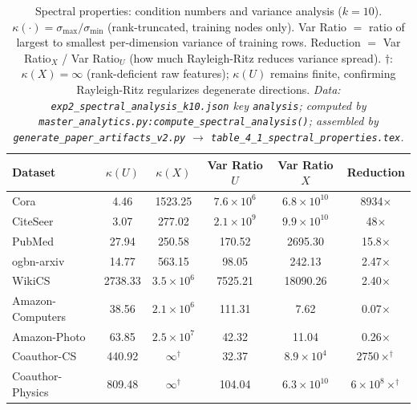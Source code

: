 \documentclass[11pt]{article}
\begin{document}
\begin{table}[H]
\centering\small
\caption{Spectral properties: condition numbers and variance analysis ($k{=}10$).
$\kappa(\cdot){=}\sigma_{\max}/\sigma_{\min}$ (rank-truncated, training nodes only).
Var Ratio $=$ ratio of largest to smallest per-dimension variance of training rows.
Reduction $=$ Var Ratio$_X$ / Var Ratio$_U$ (how much Rayleigh-Ritz reduces variance spread).
$\dagger$: $\kappa(X){=}\infty$ (rank-deficient raw features); $\kappa(U)$ remains finite,
confirming Rayleigh-Ritz regularizes degenerate directions.
\textit{\scriptsize Data: \texttt{exp2\_spectral\_analysis\_k10.json} key \texttt{analysis};
computed by \texttt{master\_analytics.py:compute\_spectral\_analysis()};
assembled by \texttt{generate\_paper\_artifacts\_v2.py} $\to$ \texttt{table\_4\_1\_spectral\_properties.tex}.}}
\label{tab:spectral_properties}
\begin{tabular}{lccccc}
\toprule
Dataset & $\kappa(U)$ & $\kappa(X)$ & Var Ratio $U$ & Var Ratio $X$ & Reduction \\
\midrule
Cora               & 4.46   & 1523.25       & $7.6\times10^6$    & $6.8\times10^{10}$ & 8934$\times$ \\
CiteSeer           & 3.07   & 277.02        & $2.1\times10^9$    & $9.9\times10^{10}$ & 48$\times$ \\
PubMed             & 27.94  & 250.58        & 170.52             & 2695.30            & 15.8$\times$ \\
ogbn-arxiv         & 14.77  & 563.15        & 98.05              & 242.13             & 2.47$\times$ \\
WikiCS             & 2738.33& $3.5\times10^6$& 7525.21          & 18090.26           & 2.40$\times$ \\
Amazon-Computers   & 38.56  & $2.1\times10^6$& 111.31           & 7.62               & 0.07$\times$ \\
Amazon-Photo       & 63.85  & $2.5\times10^7$& 42.32            & 11.04              & 0.26$\times$ \\
Coauthor-CS        & 440.92 & $\infty^\dagger$& 32.37           & $8.9\times10^4$    & 2750$\times^\dagger$ \\
Coauthor-Physics   & 809.48 & $\infty^\dagger$& 104.04          & $6.3\times10^{10}$ & $6\times10^8$$\times^\dagger$ \\
\bottomrule
\end{tabular}
\end{table}
\end{document}
